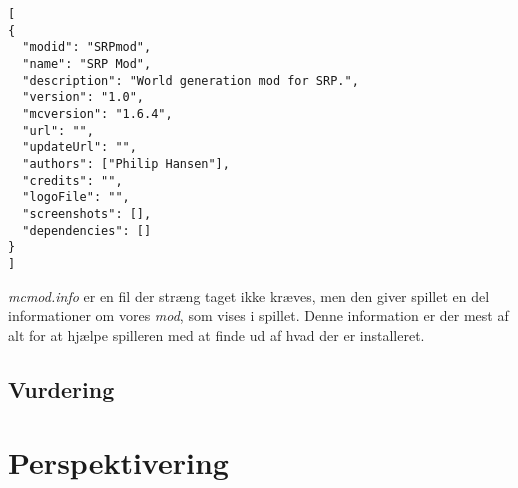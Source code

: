 \documentclass[a4paper,12pt]{report}
\begin{document}
\begin{lstlisting}[label=mcmod.info,caption=mcmod.info]
[
{
  "modid": "SRPmod",
  "name": "SRP Mod",
  "description": "World generation mod for SRP.",
  "version": "1.0",
  "mcversion": "1.6.4",
  "url": "",
  "updateUrl": "",
  "authors": ["Philip Hansen"],
  "credits": "",
  "logoFile": "",
  "screenshots": [],
  "dependencies": []
}
]
\end{lstlisting}
	\emph{mcmod.info} er en fil der str\ae ng taget ikke kr\ae ves, men den giver spillet en del informationer om vores \emph{mod}, som vises i spillet.
	Denne information er der mest af alt for at hj\ae lpe spilleren med at finde ud af hvad der er installeret.
	\subsection{Vurdering}
	\section{Perspektivering}
\end{document}
